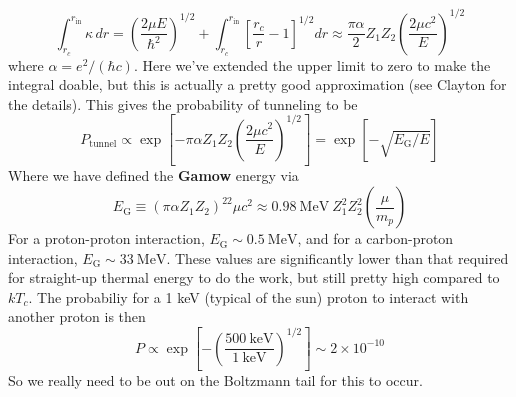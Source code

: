 \documentclass[10pt]{article}
\numberwithin{equation}{section}
\begin{document}
  \begin{equation}
    \label{eq:117}
    \int_{r_c}^{r_{\mathrm{in}}}\kappa\, dr= \left(\frac{2\mu
        E}{\hbar^2}\right)^{1/2} + 
    \int_{r_c}^{r_{\mathrm{in}}}\left[\frac{r_c}{r}-1\right]^{1/2}dr\approx
    \frac{\pi \alpha}{2}Z_1Z_2\left(\frac{2\mu c^2}{E}\right)^{1/2}
  \end{equation}
  where $\alpha=e^2/(\hbar c)$. Here we've extended the upper limit to zero to
  make the integral doable, but this is actually a pretty good approximation
  (see Clayton for the details). This gives the probability of tunneling to be
  \begin{equation}
    \label{eq:118}
    P_{\mathrm{tunnel}}\propto \exp\left[-\pi\alpha
      Z_1Z_2\left(\frac{2\mu c^2}{E}\right)^{1/2}\right]=\exp\left[-\sqrt
{E_\mathrm{G}/E}\right]
  \end{equation}
  Where we have defined the \textbf{Gamow} energy via
  \begin{equation}
    \label{eq:119}
    E_{\mathrm{G}}\equiv \left(\pi\alpha Z_1Z_2\right)^22\mu
    c^2\approx 0.98\ \mathrm{MeV}\ Z_1^2Z_2^2\left(\frac{\mu}{m_p}\right)
  \end{equation}
  For a proton-proton interaction, $E_{\mathrm{G}}\sim 0.5\ \mathrm{MeV}$, and
  for a carbon-proton interaction, $E_{\mathrm{G}}\sim 33\ \mathrm{MeV}$. These
  values are significantly lower than that required for straight-up thermal
  energy to do the work, but still pretty high compared to $kT_c$. The
  probabiliy for a 1 keV (typical of the sun) proton to interact with another
  proton is then
  \begin{equation}
    \label{eq:120}
    P\propto \exp\left[-\left(\frac{500\ \mathrm{keV}}{1\
          \mathrm{keV}}\right)^{1/2}\right]\sim 2\times 10^{-10}
  \end{equation}
  So we really need to be out on the Boltzmann tail for this to occur.\\
	
\end{document}
